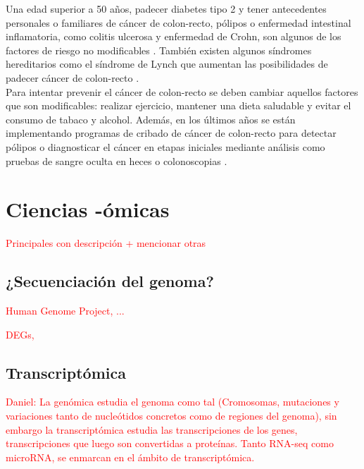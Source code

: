 Una edad superior a 50 años, padecer diabetes tipo 2 y tener antecedentes personales o familiares de cáncer de colon-recto, pólipos o enfermedad intestinal inflamatoria, como colitis ulcerosa y enfermedad de Crohn, son algunos de los factores de riesgo no modificables \cite{AmericanCancerSociety2020}. También existen algunos síndromes hereditarios como el síndrome de Lynch que aumentan las posibilidades de padecer cáncer de colon-recto \cite{Lynch2003}.\\

Para intentar prevenir el cáncer de colon-recto se deben cambiar aquellos factores que son modificables: realizar ejercicio, mantener una dieta saludable y evitar el consumo de tabaco y alcohol. Además, en los últimos años se están implementando programas de cribado de cáncer de colon-recto para detectar pólipos o diagnosticar el cáncer en etapas iniciales mediante análisis como pruebas de sangre oculta en heces o colonoscopias \cite{Levin2008}.\\


\section{Ciencias -ómicas}

\textcolor{red}{Principales con descripción + mencionar otras}

\subsection{¿Secuenciación del genoma?}

\textcolor{red}{Human Genome Project, ...}

\textcolor{red}{DEGs, }

\subsection{Transcriptómica}

\textcolor{red}{Daniel: La
	genómica estudia el genoma como tal (Cromosomas, mutaciones y
	variaciones tanto de nucleótidos concretos como de regiones del genoma),
	sin embargo la transcriptómica estudia las transcripciones de los genes,
	transcripciones que luego son convertidas a proteínas. Tanto RNA-seq
	como microRNA, se enmarcan en el ámbito de transcriptómica.}


